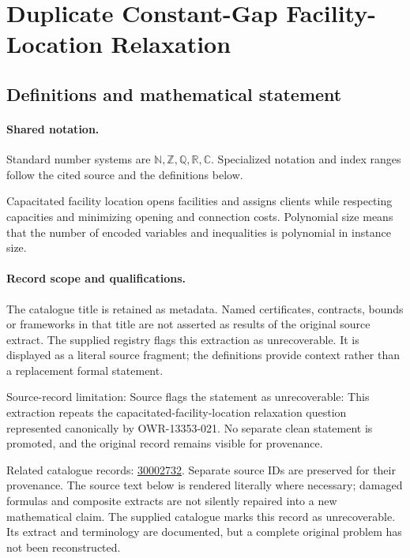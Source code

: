 \documentclass[11pt]{article}
\begin{document}
\section{Duplicate Constant-Gap Facility-Location Relaxation}\label{statement}

\subsection{Definitions and mathematical statement}

\paragraph{Shared notation.}Standard number systems are $\mathbb N,\mathbb Z,\mathbb Q,\mathbb R,\mathbb C$. Specialized notation and index ranges follow the cited source and the definitions below.


Capacitated facility location opens facilities and assigns clients while respecting capacities and minimizing opening and connection costs. Polynomial size means that the number of encoded variables and inequalities is polynomial in instance size.
\paragraph{Record scope and qualifications.}
The catalogue title is retained as metadata. Named certificates, contracts, bounds or frameworks in that title are not asserted as results of the original source extract.
The supplied registry flags this extraction as unrecoverable. It is displayed as a literal source fragment; the definitions provide context rather than a replacement formal statement.

Source-record limitation: Source flags the statement as unrecoverable: This extraction repeats the capacitated-facility-location relaxation question represented canonically by OWR-13353-021. No separate clean statement is promoted, and the original record remains visible for provenance.

Related catalogue records: \href{https://mehmetmars7.github.io/Erdosproblems-llm-hunter/problem.html?type=open_problems&id=30002732}{30002732}. Separate source IDs are preserved for their provenance.
The source text below is rendered literally where necessary; damaged formulas and composite extracts are not silently repaired into a new mathematical claim.
The supplied catalogue marks this record as unrecoverable. Its extract and terminology are documented, but a complete original problem has not been reconstructed.
\end{document}
